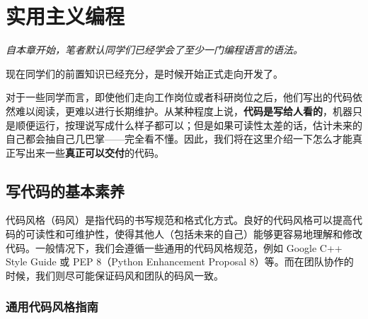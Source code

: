 \documentclass[../main.tex]{subfiles}
\begin{document}
\chapter{实用主义编程}

\begin{flushright}
  \emph{自本章开始，笔者默认同学们已经学会了至少一门编程语言的语法。}
\end{flushright}

现在同学们的前置知识已经充分，是时候开始正式走向开发了。

对于一些同学而言，即使他们走向工作岗位或者科研岗位之后，他们写出的代码依然难以阅读，更难以进行长期维护。从某种程度上说，\textbf{代码是写给人看的}，机器只是顺便运行，按理说写成什么样子都可以；但是如果可读性太差的话，估计未来的自己都会抽自己几巴掌——完全看不懂。因此，我们将在这里介绍一下怎么才能真正写出来一些\textbf{真正可以交付}的代码。

\section{写代码的基本素养}\label{sec:code-style}

代码风格（码风）是指代码的书写规范和格式化方式。良好的代码风格可以提高代码的可读性和可维护性，使得其他人（包括未来的自己）能够更容易地理解和修改代码。一般情况下，我们会遵循一些通用的代码风格规范，例如 Google C++ Style Guide 或 PEP 8（Python Enhancement Proposal 8）等。而在团队协作的时候，我们则尽可能保证码风和团队的码风一致。

\subsection{通用代码风格指南}
\end{document}
